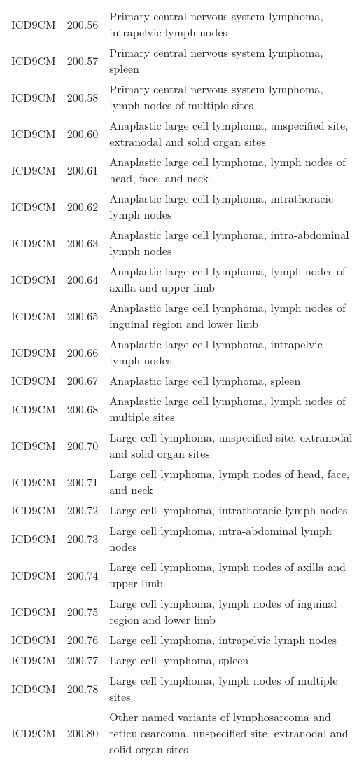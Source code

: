 \begin{longtable}{p{}p{}p{}}
  ICD9CM & 200.56 & Primary central nervous system lymphoma, intrapelvic lymph nodes \\ 
  ICD9CM & 200.57 & Primary central nervous system lymphoma, spleen \\ 
  ICD9CM & 200.58 & Primary central nervous system lymphoma, lymph nodes of multiple sites \\ 
  ICD9CM & 200.60 & Anaplastic large cell lymphoma, unspecified site, extranodal and solid organ sites \\ 
  ICD9CM & 200.61 & Anaplastic large cell lymphoma, lymph nodes of head, face, and neck \\ 
  ICD9CM & 200.62 & Anaplastic large cell lymphoma, intrathoracic lymph nodes \\ 
  ICD9CM & 200.63 & Anaplastic large cell lymphoma, intra-abdominal lymph nodes \\ 
  ICD9CM & 200.64 & Anaplastic large cell lymphoma, lymph nodes of axilla and upper limb \\ 
  ICD9CM & 200.65 & Anaplastic large cell lymphoma, lymph nodes of inguinal region and lower limb \\ 
  ICD9CM & 200.66 & Anaplastic large cell lymphoma, intrapelvic lymph nodes \\ 
  ICD9CM & 200.67 & Anaplastic large cell lymphoma, spleen \\ 
  ICD9CM & 200.68 & Anaplastic large cell lymphoma, lymph nodes of multiple sites \\ 
  ICD9CM & 200.70 & Large cell lymphoma, unspecified site, extranodal and solid organ sites \\ 
  ICD9CM & 200.71 & Large cell lymphoma, lymph nodes of head, face, and neck \\ 
  ICD9CM & 200.72 & Large cell lymphoma, intrathoracic lymph nodes \\ 
  ICD9CM & 200.73 & Large cell lymphoma, intra-abdominal lymph nodes \\ 
  ICD9CM & 200.74 & Large cell lymphoma, lymph nodes of axilla and upper limb \\ 
  ICD9CM & 200.75 & Large cell lymphoma, lymph nodes of inguinal region and lower limb \\ 
  ICD9CM & 200.76 & Large cell lymphoma, intrapelvic lymph nodes \\ 
  ICD9CM & 200.77 & Large cell lymphoma, spleen \\ 
  ICD9CM & 200.78 & Large cell lymphoma, lymph nodes of multiple sites \\ 
  ICD9CM & 200.80 & Other named variants of lymphosarcoma and reticulosarcoma, unspecified site, extranodal and solid organ sites \\ 

\end{longtable}
